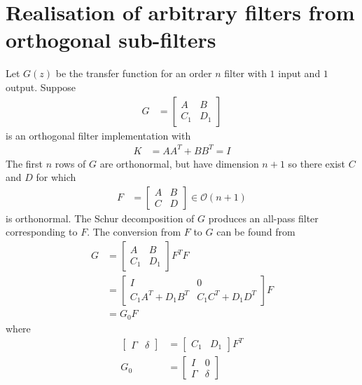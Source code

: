 \documentclass[a4paper,twoside,10pt,english]{report}
\begin{document}
\section{Realisation of arbitrary filters from orthogonal sub-filters}
Let $G\left(z\right)$ be the transfer function for an order $n$
filter with $1$ input and $1$ output. Suppose
\begin{align*}
G &= \left[\begin{array}{cc}
A & B\\
C_{1} & D_{1}
\end{array}\right]
\end{align*}
is an orthogonal filter implementation with
\begin{align*}
K &= AA^{T}+BB^{T} = I
\end{align*}
The first $n$ rows of $G$ are orthonormal, but have dimension $n+1$
so there exist $C$ and $D$ for which 
\begin{align*}
F &= \left[\begin{array}{cc}
A & B\\
C & D
\end{array}\right]\in\mathcal{O}\left(n+1\right)
\end{align*}
is orthonormal. The Schur decomposition of $G$ produces an all-pass filter
corresponding to $F$. The conversion from $F$ to $G$ can be found from
\begin{align*}
G &= \left[\begin{array}{ll}
A & B\\
C_{1} & D_{1}
\end{array}\right]F^{T}F\\
 &= \left[\begin{array}{cc}
I & 0\\
C_{1}A^{T}+D_{1}B^{T} & C_{1}C^{T}+D_{1}D^{T}
\end{array}\right]F\\
 &= G_{0}F
\end{align*}
where
\begin{align*}
\left[\begin{array}{cc}\Gamma & \delta\end{array}\right] &= 
\left[\begin{array}{cc}
C_{1} & D_{1}\end{array}\right]F^{T}\\
G_{0} &= \left[\begin{array}{cc}
I & 0\\
\Gamma & \delta
\end{array}\right]
\end{align*}
\end{document}
